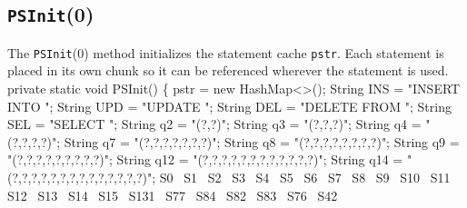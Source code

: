\documentclass{article}
\theoremstyle{definition}                   %
\begin{document}
\subsection{{\tt{}\protect{}PSInit}(0)}
The {\tt{}\protect{}PSInit}(0) method initializes the statement cache {\tt{}\protect{}pstr}. Each
statement is placed in its own chunk so it can be referenced wherever the
statement is used.
\nwenddocs{}\endmoddef{}
private static void PSInit() \{
  pstr = new HashMap<>();
  String INS = "INSERT INTO ";
  String UPD = "UPDATE ";
  String DEL = "DELETE FROM ";
  String SEL = "SELECT ";
  String q2  = "(?,?)";
  String q3  = "(?,?,?)";
  String q4  = "(?,?,?,?)";
  String q7  = "(?,?,?,?,?,?,?)";
  String q8  = "(?,?,?,?,?,?,?,?)";
  String q9  = "(?,?,?,?,?,?,?,?,?)";
  String q12 = "(?,?,?,?,?,?,?,?,?,?,?,?)";
  String q14 = "(?,?,?,?,?,?,?,?,?,?,?,?,?,?)";
  \LA{}S0~{\nwtagstyle{}}\RA{}
  \LA{}S1~{\nwtagstyle{}}\RA{}
  \LA{}S2~{\nwtagstyle{}}\RA{}
  \LA{}S3~{\nwtagstyle{}}\RA{}
  \LA{}S4~{\nwtagstyle{}}\RA{}
  \LA{}S5~{\nwtagstyle{}}\RA{}
  \LA{}S6~{\nwtagstyle{}}\RA{}
  \LA{}S7~{\nwtagstyle{}}\RA{}
  \LA{}S8~{\nwtagstyle{}}\RA{}
  \LA{}S9~{\nwtagstyle{}}\RA{}
  \LA{}S10~{\nwtagstyle{}}\RA{}
  \LA{}S11~{\nwtagstyle{}}\RA{}
  \LA{}S12~{\nwtagstyle{}}\RA{}
  \LA{}S13~{\nwtagstyle{}}\RA{}
  \LA{}S14~{\nwtagstyle{}}\RA{}
  \LA{}S15~{\nwtagstyle{}}\RA{}
  \LA{}S131~{\nwtagstyle{}}\RA{}
  \LA{}S77~{\nwtagstyle{}}\RA{}
  \LA{}S84~{\nwtagstyle{}}\RA{}
  \LA{}S82~{\nwtagstyle{}}\RA{}
  \LA{}S83~{\nwtagstyle{}}\RA{}
  \LA{}S76~{\nwtagstyle{}}\RA{}
  \LA{}S42~{\nwtagstyle{}}\RA{}
\end{document}
